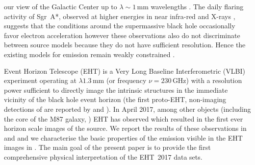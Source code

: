 our view of the Galactic Center up to $\lambda \sim 1$\,mm wavelengths \citep{2016ApJ...824...40O, 2017MNRAS.471.3563D, 2018ApJ...865..104J,2019A&A...621A.119B}. The daily flaring activity of Sgr~A*, observed at higher energies in near infra-red and X-rays \citep{2009ApJ...698..676D,2019ApJ...886...96H}, suggests that the conditions around the supermassive black hole occasionally favor electron acceleration \citep{2000ApJ...541..234O,2020MNRAS.494.5923P} however these observations also do not discriminate between source models because they do not have sufficient resolution. Hence the existing models for \sgra emission remain weakly constrained \citep[see e.g.,][]{2005ApJ...621..785G,2006MNRAS.370..219M,
  2007A&A...474....1M, 2007MNRAS.379.1519M,2007ApJ...671.1696S, 2009A&A...508L..13M,
  2009ApJ...701..521C, 2009ApJ...706..497M, 2012ApJ...746L..10D,
  2012MNRAS.421.1315Z, 2012ApJ...755..133S, 2013A&A...559L...3M, 2014A&A...570A...7M,  2015ApJ...812..103C,
  2015ApJ...799....1C, 
  2016A&A...588A..57F,
  2016ApJ...826...77B, 2016ApJ...831....4P, 2016MNRAS.455.2187M,
  2017ApJ...837..180G, 2017ApJ...844...35M, 2017ApJ...851..148M,
  2017MNRAS.467.3604R, 2018A&A...612A..34D, 2018ApJ...856..163M,
 2018ApJ...863..148P,
 2018JCAP...07..015H, 2018MNRAS.478.1875J,
  2018MNRAS.478.5209C,  2019ApJ...884..148B,
  2020ApJ...896L...6R, 2020ApJ...897...99T, 2020MNRAS.492.3272R,
  2020MNRAS.493.1404A, 2020MNRAS.494.4168D, 
  2020MNRAS.497.4999D, 2020ApJ...896L...6R, 2021ApJ...917....8B,
  2021MNRAS.502.2023P,2021arXiv210105327E}.


Event Horizon Telescope (EHT) is a Very Long Baseline Interferometric (VLBI) experiment 
operating at $\lambda1.3$\,mm (or frequency $\nu=230$\,GHz)
with a resolution power sufficient to directly image the intrinsic \sgra structures in the immediate vicinity of the black hole event horizon (the first proto-EHT, non-imaging detections of \sgra are reported by \citealt{2008Natur.455...78D, 2015Sci...350.1242J} and \citealt{2018ApJ...859...60L}). In April 2017, among other objects (including the core of the M87 galaxy, ) EHT has observed \sgra which resulted in the first ever horizon scale images of the source. We report the results of these observations in  and  and we characterise the basic properties of the emission visible in the EHT images in . The main goal of the present paper  is to provide the first comprehensive physical interpretation of the EHT~2017 \sgra data sets. 

